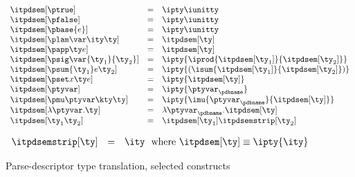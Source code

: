 {\begin{figure}
\fbox{$\itpdsem[\ty] = \ity$}
\[ 
\begin{array}{lcl} 
\itpdsem[\ptrue] & = & \ipty \iunitty \\                                                  
\itpdsem[\pfalse] & = & \ipty \iunitty \\                                                  
\itpdsem[\pbase{e}] & = & \ipty \iunitty\\
\itpdsem[\plam \var \ity \ty] & = & \itpdsem[\ty] \\
\itpdsem[\papp \ty e] & = & \itpdsem[\ty] \\
\itpdsem[\psig \var {\ty_1} {\ty_2}] & = & 
               \ipty {\iprod {\itpdsem[\ty_1]} {\itpdsem[\ty_2]}} \\
\itpdsem[\psum {\ty_1} e {\ty_2}] & = & 
               \ipty {(\isum {\itpdsem[\ty_1]} {\itpdsem[\ty_2]})} \\
\itpdsem[\pset x \ty e] & = & \ipty {\itpdsem[\ty]} \\
\itpdsem[\ptyvar] & = & \ipty{\ptyvar_\pdbname} \\
\itpdsem[\pmu \ptyvar \kty \ty] & = & 
  \ipty{\imu{\ptyvar_\pdbname}{\itpdsem[\ty]}} \\
\itpdsem[\lambda \ptyvar.\ty]      
     & = & \lambda \ptyvar_\pdbname.\itpdsem[\ty] \\
\itpdsem[\ty_1 \ty_2]            & = & \itpdsem[\ty_1] \itpdsemstrip[\ty_2] \\
\end{array}
\]

\fbox{$\itpdsemstrip[\ty] = \ity$}

\[
\begin{array}{lcl} 
\itpdsemstrip[\ty] & = & \ity \ \ \mbox{where}\ \itpdsem[\ty] \equiv \ipty{\ity}
\end{array}
\]
\caption{Parse-descriptor type translation, selected constructs}
\label{fig:pd-tys}
\end{figure}

}
